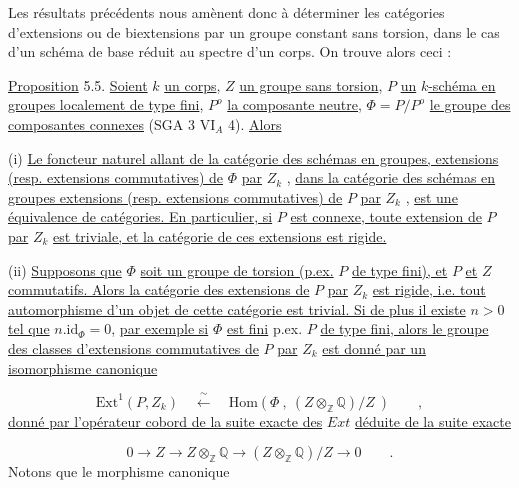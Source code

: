 Les résultats précédents nous amènent donc à déterminer les catégories d'extensions ou de biextensions par un groupe constant sans torsion, dans le cas d'un schéma de base réduit au spectre d'un corps. On trouve alors ceci :



\underline{Proposition} 5.5. \underline{Soient} $k$ \underline{un corps}, $Z$ \underline{un groupe sans torsion}, $P$ \underline{un} $k$\underline{-schéma en groupes localement de type fini}, $P^{o}$ \underline{la composante neutre}, $\Phi = P/P^{o}$ \underline{le groupe des composantes connexes} (SGA 3 $\mathrm{VI}_{A}$ 4). \underline{Alors}

(i) \underline{Le foncteur naturel allant de la catégorie des schémas en groupes, extensions (resp. extensions commutatives) de} $\Phi$ \underline{par} $Z_{k}$ , \underline{dans la catégorie des schémas en groupes extensions (resp. extensions commutatives) de} $P$ \underline{par} $Z_{k}$ , \underline{est une équivalence de catégories. En particulier, si} $P$ \underline{est connexe, toute extension de} $P$ \underline{par} $Z_{k}$ \underline{est triviale, et la catégorie de ces extensions est rigide.}

(ii) \underline{Supposons que} $\Phi$ \underline{soit un groupe de torsion (p.ex.} $P$ \underline{de type fini), et} $P$ \underline{et} $Z$ \underline{commutatifs. Alors la catégorie des extensions de} $P$ \underline{par} $Z_{k}$ \underline{est rigide, i.e. tout automorphisme d'un objet de cette catégorie est trivial. Si de plus il existe} $n > 0$ \underline{tel que} $n.\mathrm{id}_{\Phi} = 0$, \underline{par exemple si} $\Phi$ \underline{est fini} p.ex. $P$ \underline{de type fini, alors le groupe des classes d'extensions commutatives de} $P$ \underline{par} $Z_{k}$ \underline{est donné par un isomorphisme canonique}

\begin{equation}\tag{5.5.1}
\mathrm{Ext}^{1}(P,Z_{k}) \quad \xleftarrow{\;\sim\;} \quad \mathrm{Hom}(\Phi\ ,\ (Z\otimes_{\mathbb{Z}}\mathbb{Q})/Z\ ) \qquad ,
\end{equation}
\underline{donné par l'opérateur cobord de la suite exacte des} $Ext$ \underline{déduite de la suite exacte}

\begin{equation}\tag{5.5.2}
0 \longrightarrow Z \longrightarrow Z\otimes_{\mathbb{Z}}\mathbb{Q} \longrightarrow (Z\otimes_{\mathbb{Z}}\mathbb{Q})/Z \longrightarrow 0 \qquad .
\end{equation}
Notons que le morphisme canonique

